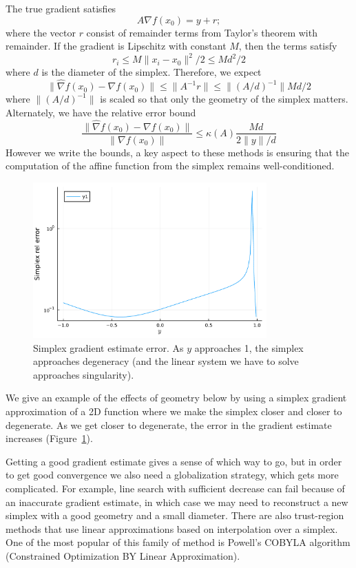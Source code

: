 \documentclass[12pt, leqno]{article} %
\begin{document}
The true gradient satisfies \[A \nabla f(x_0) = y + r;\] where the
vector \(r\) consist of remainder terms from Taylor's theorem with
remainder. If the gradient is Lipschitz with constant \(M\), then the
terms satisfy \[r_i \leq M \|x_i-x_0\|^2/2 \leq M d^2/2\] where \(d\) is
the diameter of the simplex. Therefore, we expect
\[\|\hat{\nabla} f(x_0) - \nabla f(x_0)\| \leq 
  \|A^{-1} r\| \leq \|(A/d)^{-1}\| Md/2\] where \(\|(A/d)^{-1}\|\) is
scaled so that only the geometry of the simplex matters. Alternately, we
have the relative error bound
\[\frac{\|\hat{\nabla} f(x_0) - \nabla f(x_0)\|}{\|\nabla f(x_0)\|} \leq 
  \kappa(A) \frac{Md}{2\|y\|/d}\] However we write the bounds, a key
aspect to these methods is ensuring that the computation of the affine
function from the simplex remains well-conditioned.

\begin{figure}
\begin{center}
\includegraphics[width=0.8\textwidth]{fig/2023-05-01-simplex-err.pdf}
\end{center}
\caption{Simplex gradient estimate error.  As $y$ approaches 1, the simplex
  approaches degeneracy (and the linear system we have to solve approaches
  singularity).}
\label{fig:simplex-err}
\end{figure}

We give an example of the effects of geometry below by using a simplex
gradient approximation of a 2D function where we make the simplex closer
and closer to degenerate.  As we get closer to degenerate, the error in
the gradient estimate increases (Figure~\ref{fig:simplex-err}).

Getting a good gradient estimate gives a sense of which way to go, but
in order to get good convergence we also need a globalization strategy,
which gets more complicated. For example, line search with sufficient
decrease can fail because of an inaccurate gradient estimate, in which
case we may need to reconstruct a new simplex with a good geometry and a
small diameter. There are also trust-region methods that use linear
approximations based on interpolation over a simplex. One of the most
popular of this family of method is Powell's COBYLA algorithm
(Constrained Optimization BY Linear Approximation).
\end{document}
